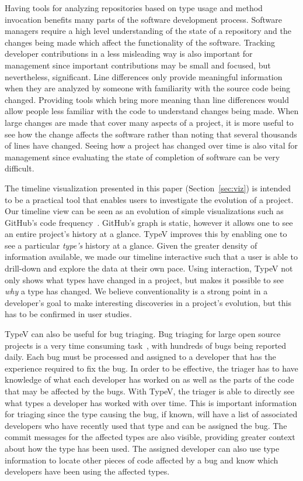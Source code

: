 Having tools for analyzing repositories based on type usage and method invocation benefits many parts of the software development process. Software managers require a high level understanding of the state of a repository and the changes being made which affect the functionality of the software. Tracking developer contributions in a less misleading way is also important for management since important contributions may be small and focused, but nevertheless, significant. Line differences only provide meaningful information when they are analyzed by someone with familiarity with the source code being changed. Providing tools which bring more meaning than line differences would allow people less familiar with the code to understand changes being made. When large changes are made that cover many aspects of a project, it is more useful to see how the change affects the software rather than noting that several thousands of lines have changed. Seeing how a project has changed over time is also vital for management since evaluating the state of completion of software can be very difficult.


The timeline visualization presented in this paper (Section~\ref{sec:viz}) is intended to be a practical tool that enables users to investigate the evolution of a project. Our timeline view can be seen as an evolution of simple visualizations such as GitHub's code frequency~\cite{github-graphs}. GitHub's graph is static, however it allows one to see an entire project's history at a glance. TypeV improves this by enabling one to see a particular \emph{type's} history at a glance. Given the greater density of information available, we made our timeline interactive such that a user is able to drill-down and explore the data at their own pace. Using interaction, TypeV not only shows what types have changed in a project, but makes it possible to see \emph{why} a type has changed. We believe conventionality is a strong point in a developer's goal to make interesting discoveries in a project's evolution, but this has to be confirmed in user studies.

TypeV can also be useful for bug triaging. Bug triaging for large open source projects is a very time consuming task~\cite{badashian2015}, with hundreds  of bugs being reported daily. Each bug must be processed and assigned to a developer that has the experience required to fix the bug. In order to be effective, the triager has to have knowledge of what each developer has worked on as well as the parts of the code that may be affected by the bugs. With TypeV, the triager is able to directly see what types a developer has worked with over time. This is important information for triaging since the type causing the bug, if known, will have a list of associated developers who have recently used that type and can be assigned the bug. The commit messages for the affected types are also visible, providing greater context about how the type has been used. The assigned developer can also use type information to locate other pieces of code affected by a bug and know which developers have been using the affected types.

